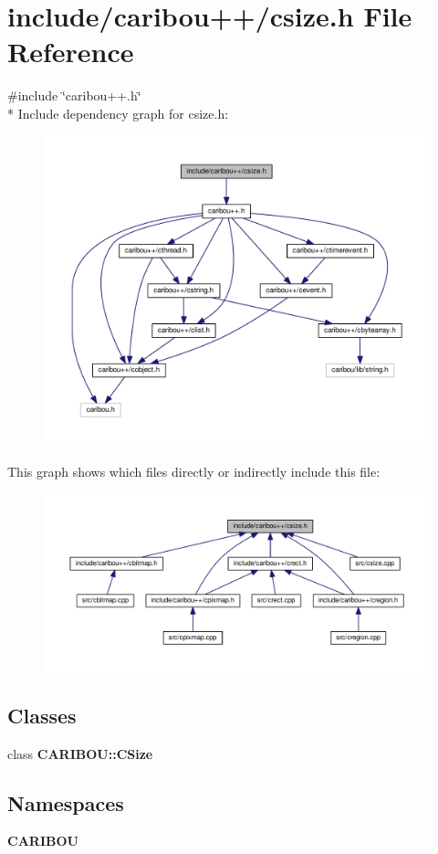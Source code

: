 \section{include/caribou++/csize.h File Reference}
\label{csize_8h}
{\ttfamily \#include \char`\"{}caribou++.\+h\char`\"{}}\\*
Include dependency graph for csize.\+h\+:
\nopagebreak
\begin{figure}[H]
\begin{center}
\leavevmode
\includegraphics[width=350pt]{csize_8h__incl}
\end{center}
\end{figure}
This graph shows which files directly or indirectly include this file\+:
\nopagebreak
\begin{figure}[H]
\begin{center}
\leavevmode
\includegraphics[width=350pt]{csize_8h__dep__incl}
\end{center}
\end{figure}
\subsection*{Classes}
\begin{DoxyCompactItemize}
\item 
class {\bf C\+A\+R\+I\+B\+O\+U\+::\+C\+Size}
\end{DoxyCompactItemize}
\subsection*{Namespaces}
\begin{DoxyCompactItemize}
\item 
 {\bf C\+A\+R\+I\+B\+OU}
\end{DoxyCompactItemize}
